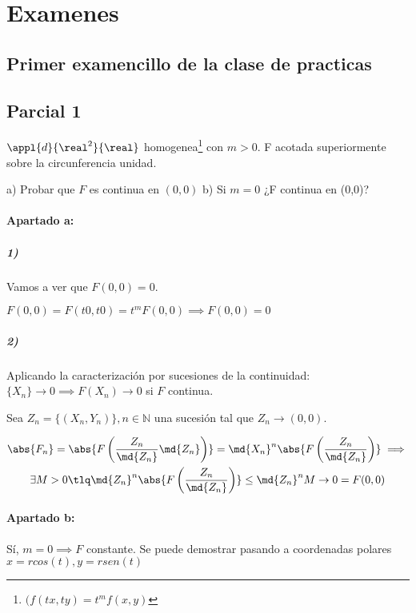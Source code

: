 \section{Examenes}

\subsection{Primer examencillo de la clase de practicas}

\subsection{Parcial 1}

\begin{problem}[1]

$\appl{d}{\real^2}{\real}$ homogenea\footnote{$(f(tx,ty) = t^mf(x,y)$} con $m>0$. F acotada superiormente sobre la circunferencia unidad.

a) Probar que $F$ es continua en $(0,0)$
b) Si $m=0$ ¿F continua en (0,0)?
\solution
\paragraph{Apartado a:}
\subparagraph{1)}
Vamos a ver que $F(0,0) = 0$.

$F(0,0) = F(t0,t0) = t^mF(0,0) \implies F(0,0) = 0$

\subparagraph{2)}
Aplicando la caracterización por sucesiones de la continuidad: $\{X_n\} \rightarrow 0 \implies F(X_n) \rightarrow 0$ si $F$ continua.

Sea $Z_n = \{(X_n,Y_n)\}, n\in \mathbb{N}$ una sucesión tal que $Z_n \rightarrow (0,0)$.

\begin{gather*}\abs{F_n} = \abs{F\left(\frac{Z_n}{\md{Z_n}}\md{Z_n}\right)} =
\md{X_n}^n \abs{F\left(\frac{Z_n}{\md{Z_n}}\right)} \implies \\
\exists M>0 \tlq \md{Z_n}^n \abs{F\left(\frac{Z_n}{\md{Z_n}}\right)} \leq \md{Z_n}^n M \rightarrow 0 = F(0,0)
\end{gather*}
\paragraph{Apartado b:}
Sí, $m=0 \implies F$ constante. Se puede demostrar pasando a coordenadas polares $x=rcos(t),y=rsen(t)$

\end{problem}

